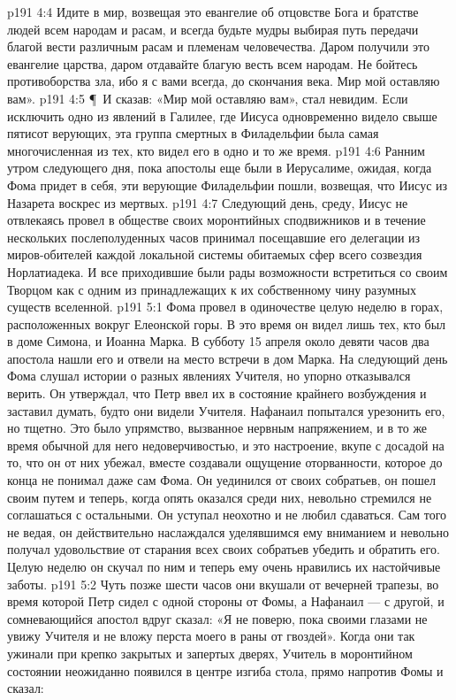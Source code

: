 \vs p191 4:4 Идите в мир, возвещая это евангелие об отцовстве Бога и братстве людей всем народам и расам, и всегда будьте мудры выбирая путь передачи благой вести различным расам и племенам человечества. Даром получили это евангелие царства, даром отдавайте благую весть всем народам. Не бойтесь противоборства зла, ибо я с вами всегда, до скончания века. Мир мой оставляю вам».
\vs p191 4:5 \P\ И сказав: «Мир мой оставляю вам», стал невидим. Если исключить одно из явлений в Галилее, где Иисуса одновременно видело свыше пятисот верующих, эта группа смертных в Филадельфии была самая многочисленная из тех, кто видел его в одно и то же время.
\vs p191 4:6 Ранним утром следующего дня, пока апостолы еще были в Иерусалиме, ожидая, когда Фома придет в себя, эти верующие Филадельфии пошли, возвещая, что Иисус из Назарета воскрес из мертвых.
\vs p191 4:7 Следующий день, среду, Иисус не отвлекаясь провел в обществе своих моронтийных сподвижников и в течение нескольких послеполуденных часов принимал посещавшие его делегации из миров\hyp{}обителей каждой локальной системы обитаемых сфер всего созвездия Норлатиадека. И все приходившие были рады возможности встретиться со своим Творцом как с одним из принадлежащих к их собственному чину разумных существ вселенной.
\vs p191 5:1 Фома провел в одиночестве целую неделю в горах, расположенных вокруг Елеонской горы. В это время он видел лишь тех, кто был в доме Симона, и Иоанна Марка. В субботу 15 апреля около девяти часов два апостола нашли его и отвели на место встречи в дом Марка. На следующий день Фома слушал истории о разных явлениях Учителя, но упорно отказывался верить. Он утверждал, что Петр ввел их в состояние крайнего возбуждения и заставил думать, будто они видели Учителя. Нафанаил попытался урезонить его, но тщетно. Это было упрямство, вызванное нервным напряжением, и в то же время обычной для него недоверчивостью, и это настроение, вкупе с досадой на то, что он от них убежал, вместе создавали ощущение оторванности, которое до конца не понимал даже сам Фома. Он уединился от своих собратьев, он пошел своим путем и теперь, когда опять оказался среди них, невольно стремился не соглашаться с остальными. Он уступал неохотно и не любил сдаваться. Сам того не ведая, он действительно наслаждался уделявшимся ему вниманием и невольно получал удовольствие от старания всех своих собратьев убедить и обратить его. Целую неделю он скучал по ним и теперь ему очень нравились их настойчивые заботы.
\vs p191 5:2 Чуть позже шести часов они вкушали от вечерней трапезы, во время которой Петр сидел с одной стороны от Фомы, а Нафанаил --- с другой, и сомневающийся апостол вдруг сказал: «Я не поверю, пока своими глазами не увижу Учителя и не вложу перста моего в раны от гвоздей». Когда они так ужинали при крепко закрытых и запертых дверях, Учитель в моронтийном состоянии неожиданно появился в центре изгиба стола, прямо напротив Фомы и сказал:
